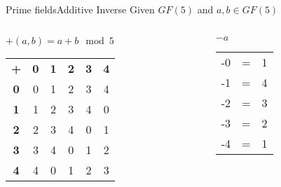 \begin{frame}[t]{Prime fields}{Additive Inverse}
	Given $GF(5)$ and $a, b \in GF(5)$
	\medskip
	
	\begin{columns}
		\begin{column}{0.5\textwidth}
			\centering $+(a, b) = a + b \mod 5$				
			\begin{table}[]
				\begin{tabular}{cccccc}
					\textbf{+} & \textbf{0} & \textbf{1} & \textbf{2} & \textbf{3} & \textbf{4} \\
					\textbf{0} & 0          & 1          & 2          & 3          & 4          \\
					\textbf{1} & 1          & 2          & 3          & 4          & 0          \\
					\textbf{2} & 2          & 3          & 4          & 0          & 1          \\
					\textbf{3} & 3          & 4          & 0          & 1          & 2          \\
					\textbf{4} & 4          & 0          & 1          & 2          & 3         
				\end{tabular}
			\end{table}
		\end{column}
		\begin{column}{0.5\textwidth}  %
			\centering $-a$		
			\begin{table}[]
				\begin{tabular}{ccc}
					-0  & = & 1 \\
					-1 & = & 4 \\
					-2  & = & 3 \\
					-3  & = & 2 \\
					-4  & = & 1
				\end{tabular}
			\end{table}
		\end{column}
	\end{columns}
\end{frame}

